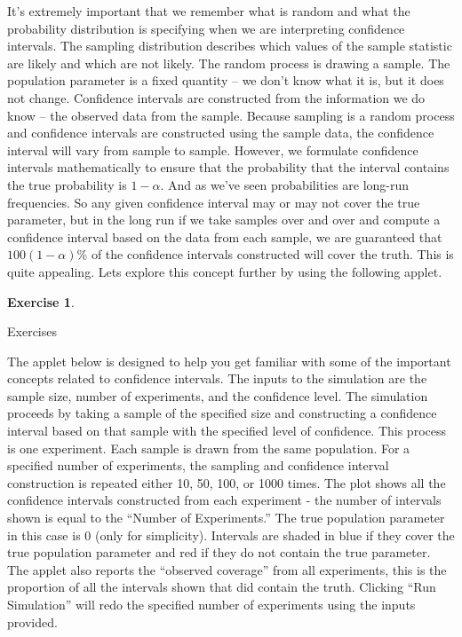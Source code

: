 \documentclass[
]{book}
\theoremstyle{definition}
\theoremstyle{definition}
\theoremstyle{definition}
\newtheorem{exercise}{Exercise}[chapter]
\theoremstyle{remark}
\begin{document}
It's extremely important that we remember what is random and what the probability distribution is specifying when we are interpreting confidence intervals. The sampling distribution describes which values of the sample statistic are likely and which are not likely. The random process is drawing a sample. The population parameter is a fixed quantity -- we don't know what it is, but it does not change. Confidence intervals are constructed from the information we do know -- the observed data from the sample. Because sampling is a random process and confidence intervals are constructed using the sample data, the confidence interval will vary from sample to sample. However, we formulate confidence intervals mathematically to ensure that the probability that the interval contains the true probability is \(1 - \alpha\). And as we've seen probabilities are long-run frequencies. So any given confidence interval may or may not cover the true parameter, but in the long run if we take samples over and over and compute a confidence interval based on the data from each sample, we are guaranteed that \(100(1 - \alpha)\)\% of the confidence intervals constructed will cover the truth. This is quite appealing. Lets explore this concept further by using the following applet.

\begin{exercise}
\protect\hypertarget{exr:unlabeled-div-7}{}\label{exr:unlabeled-div-7}

Exercises

\end{exercise}

The applet below is designed to help you get familiar with some of the important concepts related to confidence intervals. The inputs to the simulation are the sample size, number of experiments, and the confidence level. The simulation proceeds by taking a sample of the specified size and constructing a confidence interval based on that sample with the specified level of confidence. This process is one experiment. Each sample is drawn from the same population. For a specified number of experiments, the sampling and confidence interval construction is repeated either 10, 50, 100, or 1000 times. The plot shows all the confidence intervals constructed from each experiment - the number of intervals shown is equal to the ``Number of Experiments.'' The true population parameter in this case is 0 (only for simplicity). Intervals are shaded in blue if they cover the true population parameter and red if they do not contain the true parameter. The applet also reports the ``observed coverage'' from all experiments, this is the proportion of all the intervals shown that did contain the truth. Clicking ``Run Simulation'' will redo the specified number of experiments using the inputs provided.
\end{document}
